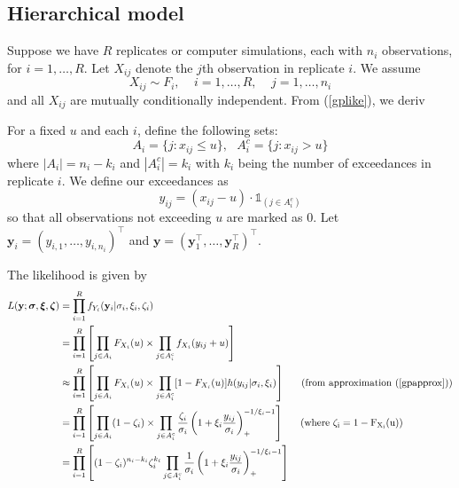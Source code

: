 \documentclass[12pt]{article}
\newcommand{\m}[1]{\mathbf{\bm{#1}}}
\newcommand{\ind}{\mathds{1}}
\newcommand{\m}[1]{\mathbf{\bm{#1}}}
\begin{document}

\subsection{Hierarchical model}
\label{hier}

Suppose we have $R$ replicates or computer simulations, each with $n_i$ observations, for $i=1,\ldots,R$. Let $X_{ij}$ denote the $j$th observation in replicate $i$. We assume
\[ X_{ij} \sim F_i,~~~~~i=1,\ldots,R,~~~~~j=1,\ldots,n_i \]
and all $X_{ij}$ are mutually conditionally independent. From (\ref{gplike}), we deriv

For a fixed $u$ and each $i$, define the following sets:
\[ A_i = \{j:x_{ij}\leq u\},~~~ A_i^c = \{j: x_{ij}>u\} \]
where $|A_i|=n_i-k_i$ and $|A_i^c|=k_i$ with $k_i$ being the number of exceedances in replicate $i$. We define our exceedances as
\[ y_{ij} = (x_{ij}-u)\cdot \ind_{(j \in A_i^c)} \]
so that all observations not exceeding $u$ are marked as $0$. Let $\m{y}_i=(y_{i,1},\ldots,y_{i,n_i})^\top$ and $\m{y}=(\m{y}_1^\top,\ldots,\m{y}_R^\top)^\top$.
\bigskip

The likelihood is given by
\begin{align}
L(\m{y}; \m{\sigma}, \m{\xi}, \m{\zeta}) &= \prod_{i=1}^R f_{Y_i}(\m{y}_i|\sigma_i,\xi_i,\zeta_i) \nonumber \\
&= \prod_{i=1}^R\left[\prod_{j\in A_i} F_{X_i}(u) \times \prod_{j\in A_i^c} f_{X_i}(y_{ij}+u)\right] \nonumber \\
&\approx \prod_{i=1}^R\left[\prod_{j\in A_i} F_{X_i}(u) \times \prod_{j\in A_i^c} [1-F_{X_i}(u)]h(y_{ij}|\sigma_i,\xi_i)\right]~~~~~\mathrm{(from~approximation~(\ref{gpapprox}))} \nonumber \\
&= \prod_{i=1}^R\left[\prod_{j\in A_i} (1-\zeta_i)\times \prod_{j\in A_i^c} \frac{\zeta_i}{\sigma_i}\left(1+\xi_i\frac{y_{ij}}{\sigma_i}\right)_+^{-1/\xi_i-1}\right]~~~~~\mathrm{(where~\zeta_i=1-F_{X_i}(u))} \nonumber \\
&= \prod_{i=1}^R\left[(1-\zeta_i)^{n_i-k_i}\zeta_i^{k_i}\prod_{j\in A_i^c}\frac{1}{\sigma_i}\left(1+\xi_i\frac{y_{ij}}{\sigma_i}\right)_+^{-1/\xi_i-1}\right] \label{biglike}
\end{align}
\end{document}
